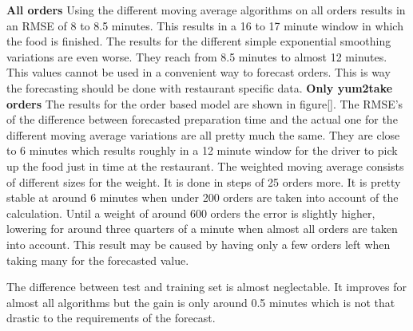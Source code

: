 \newline\textbf{All orders}\newline
Using the different moving average algorithms on all orders results in an RMSE of 8 to 8.5 minutes. This results in a 16 to 17 minute window in which the food is finished. The results for the different simple exponential smoothing variations are even worse. They reach from 8.5 minutes to almost 12 minutes. This values cannot be used in a convenient way to forecast orders. This is way the forecasting should be done with restaurant specific data.
\newline\newline\textbf{Only yum2take orders}\newline
The results for the order based model are shown in figure[]. The RMSE’s of the difference between forecasted preparation time and the actual one for the different moving average variations are all pretty much the same. They are close to 6 minutes which results roughly in a 12 minute window for the driver to pick up the food just in time at the restaurant. The weighted moving average consists of different sizes for the weight. It is done in steps of 25 orders more. It is pretty stable at around 6 minutes when under 200 orders are taken into account of the calculation. Until a weight of around 600 orders the error is slightly higher, lowering for around three quarters of a minute when almost all orders are taken into account. This result may be caused by having only a few orders left when taking many for the forecasted value.


The difference between test and training set is almost neglectable. It improves for almost all algorithms but the gain is only around 0.5 minutes which is not that drastic to the requirements of the forecast.
